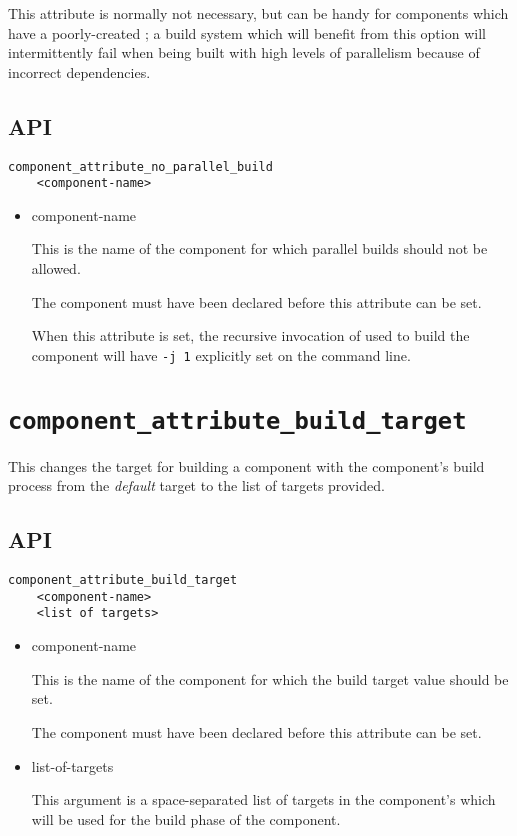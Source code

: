 This attribute is normally not necessary, but can be handy for
components which have a poorly-created \makefile; a build system which
will benefit from this option will intermittently fail when being
built with high levels of parallelism because of incorrect
dependencies.

\subsection{API}

\begin{verbatim}
component_attribute_no_parallel_build
    <component-name>
\end{verbatim}

\begin{itemize}
\item component-name

  This is the name of the component for which parallel builds should
  not be allowed.

  The component must have been declared before this attribute can be
  set.

  When this attribute is set, the recursive invocation of \gnumake
  used to build the component will have \texttt{-j 1} explicitly set
  on the command line.

\end{itemize}

\section{\texttt{component\_attribute\_build\_target}}\label{api:build-target}

This changes the target for building a component with the component's
build process from the \emph{default} \make target to the list of
targets provided.

\subsection{API}

\begin{verbatim}
component_attribute_build_target
    <component-name>
    <list of targets>
\end{verbatim}

\begin{itemize}
\item component-name

  This is the name of the component for which the build target value
  should be set.

  The component must have been declared before this attribute can be
  set.

\item list-of-targets

  This argument is a space-separated list of targets in the
  component's \makefile which will be used for the build phase of the
  component.

\end{itemize}

